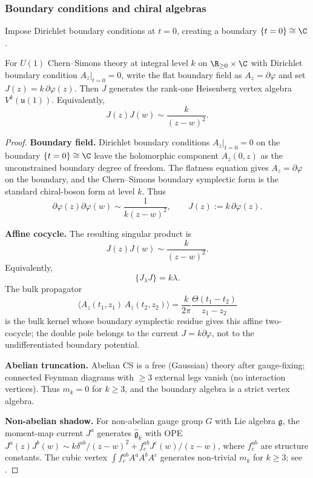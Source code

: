 \subsubsection{Boundary conditions and chiral algebras}

Impose Dirichlet boundary conditions at $t = 0$, creating a boundary $\{t=0\} \cong \C$.

\begin{theorem}
\label{thm:CS_boundary}
For $U(1)$ Chern--Simons theory at integral level $k$ on
$\R_{\geq 0}\times\C$ with Dirichlet boundary condition
$A_{\bar z}|_{t=0}=0$, write the flat boundary field as
$A_z=\partial\varphi$ and set \(J(z)=k\,\partial\varphi(z)\). Then
\(J\) generates
the rank-one Heisenberg vertex algebra $V^k(\mathfrak u(1))$.
Equivalently,
\[
J(z)J(w)\sim \frac{k}{(z-w)^2}.
\]
\end{theorem}

\begin{proof}
\textbf{Boundary field.}
Dirichlet boundary conditions $A_{\bar z}|_{t=0} = 0$ on the boundary
$\{t=0\} \cong \C$ leave the holomorphic component $A_z(0,z)$ as the
unconstrained boundary degree of freedom.  The flatness equation gives
$A_z=\partial\varphi$ on the boundary, and the Chern--Simons boundary
symplectic form is the standard chiral-boson form at level \(k\).
Thus
\[
\partial\varphi(z)\partial\varphi(w)\sim
\frac{1}{k(z-w)^2},
\qquad
J(z):=k\,\partial\varphi(z).
\]

\textbf{Affine cocycle.}
The resulting singular product is
\[
J(z)J(w)\sim \frac{k}{(z-w)^2}.
\]
Equivalently,
\begin{equation}
\label{eq:U1_OPE}
\{J_\lambda J\}=k\lambda.
\end{equation}
The bulk propagator
\[
\langle A_z(t_1,z_1)\, A_{\bar z}(t_2,z_2) \rangle
= \frac{k}{2\pi}\frac{\Theta(t_1 - t_2)}{z_1 - z_2}
\]
is the bulk kernel whose boundary symplectic residue gives this affine
two-cocycle; the double pole belongs to the current
\(J=k\partial\varphi\), not to the undifferentiated boundary potential.

\textbf{Abelian truncation.}
Abelian CS is a free (Gaussian) theory after gauge-fixing; connected Feynman diagrams with $\ge 3$ external legs vanish (no interaction vertices). Thus $m_k = 0$ for $k \ge 3$, and the boundary algebra is a strict vertex algebra.

\textbf{Non-abelian shadow.}
For non-abelian gauge group $G$ with Lie algebra $\mathfrak{g}$, the
moment-map current \(J^a\) generates $\widehat{\mathfrak{g}}_k$ with
OPE $J^a(z) J^b(w) \sim k\delta^{ab}/(z-w)^2 +
f^{ab}_c J^c(w)/(z-w)$, where $f^{ab}_c$ are structure constants.
The cubic vertex $\int f^{ab}_c A^a A^b A^c$ generates non-trivial
$m_k$ for $k \ge 3$; see \cite{CDG20,KZ25}.
\end{proof}

